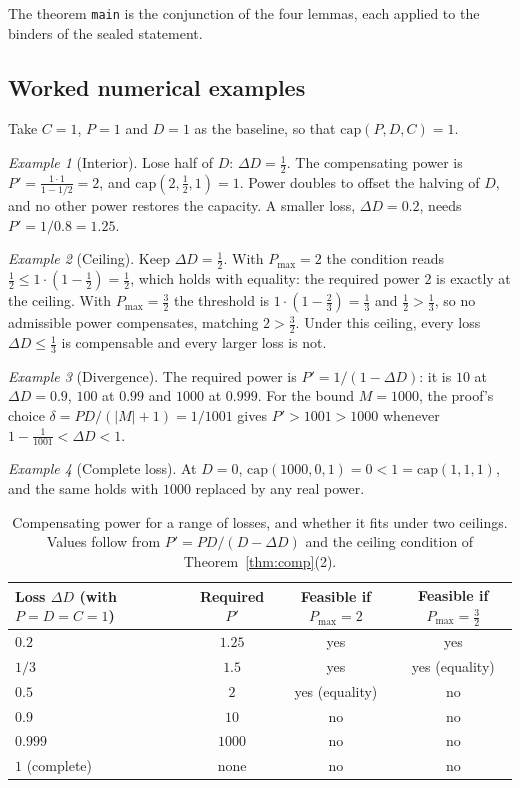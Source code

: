 \documentclass[11pt]{article}
\theoremstyle{remark}
\newtheorem{example}{Example}
\begin{document}
The theorem \texttt{main} is the conjunction of the four lemmas, each applied to the binders of
the sealed statement.

\subsection{Worked numerical examples}
Take $C=1$, $P=1$ and $D=1$ as the baseline, so that $\mathrm{cap}(P,D,C)=1$.

\begin{example}[Interior]
Lose half of $D$: $\Delta D=\tfrac12$. The compensating power is
$P'=\frac{1\cdot1}{1-1/2}=2$, and $\mathrm{cap}(2,\tfrac12,1)=1$. Power doubles to offset the
halving of $D$, and no other power restores the capacity. A smaller loss, $\Delta D=0.2$, needs
$P'=1/0.8=1.25$.
\end{example}

\begin{example}[Ceiling]
Keep $\Delta D=\tfrac12$. With $P_{\max}=2$ the condition reads
$\tfrac12\le1\cdot(1-\tfrac12)=\tfrac12$, which holds with equality: the required power $2$ is
exactly at the ceiling. With $P_{\max}=\tfrac32$ the threshold is $1\cdot(1-\tfrac23)=\tfrac13$
and $\tfrac12>\tfrac13$, so no admissible power compensates, matching $2>\tfrac32$. Under this
ceiling, every loss $\Delta D\le\tfrac13$ is compensable and every larger loss is not.
\end{example}

\begin{example}[Divergence]
The required power is $P'=1/(1-\Delta D)$: it is $10$ at $\Delta D=0.9$, $100$ at $0.99$ and
$1000$ at $0.999$. For the bound $M=1000$, the proof's choice $\delta=PD/(|M|+1)=1/1001$ gives
$P'>1001>1000$ whenever $1-\tfrac1{1001}<\Delta D<1$.
\end{example}

\begin{example}[Complete loss]
At $D=0$, $\mathrm{cap}(1000,0,1)=0<1=\mathrm{cap}(1,1,1)$, and the same holds with $1000$
replaced by any real power.
\end{example}

\begin{table}[h]
\centering
\begin{tabular}{@{}lccc@{}}
\toprule
Loss $\Delta D$ (with $P=D=C=1$) & Required $P'$ & Feasible if $P_{\max}=2$ & Feasible if $P_{\max}=\tfrac32$\\
\midrule
$0.2$ & $1.25$ & yes & yes\\
$1/3$ & $1.5$ & yes & yes (equality)\\
$0.5$ & $2$ & yes (equality) & no\\
$0.9$ & $10$ & no & no\\
$0.999$ & $1000$ & no & no\\
$1$ (complete) & none & no & no\\
\bottomrule
\end{tabular}
\caption{Compensating power for a range of losses, and whether it fits under two ceilings. Values
follow from $P'=PD/(D-\Delta D)$ and the ceiling condition of Theorem~\ref{thm:comp}(2).}
\end{table}
\end{document}
